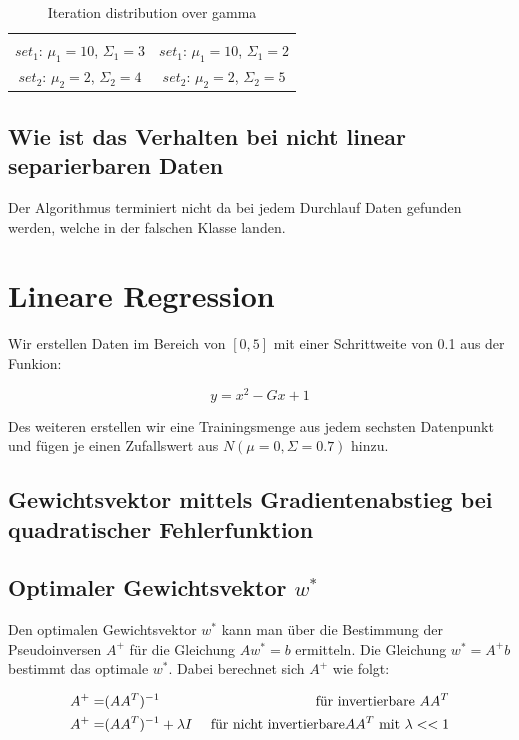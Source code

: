 \documentclass[]{report}
\begin{document}
\begin{table}[h]
\begin{tabular}{| c | c |}
 & \\
$set_1$: $\mu_1=10$, $\Sigma_1=3$ & $set_1$: $\mu_1=10$, $\Sigma_1=2$ \\
$set_2$: $\mu_2=2$, $\Sigma_2=4$ & $set_2$: $\mu_2=2$, $\Sigma_2=5$ \\
\hline
\end{tabular}
\caption{Iteration distribution over gamma}
\label{tab:DataSetsAndBounds}
\end{table}


\subsection{Wie ist das Verhalten bei nicht linear separierbaren Daten}

Der Algorithmus terminiert nicht da bei jedem Durchlauf Daten gefunden werden, welche in der falschen Klasse landen.

\section{Lineare Regression}

Wir erstellen Daten im Bereich von $[0,5]$ mit einer Schrittweite von 0.1 aus der Funkion:

\begin{equation}
y=x^2-Gx+1
\end{equation}

Des weiteren erstellen wir eine Trainingsmenge aus jedem sechsten Datenpunkt und f\"ugen je einen Zufallswert aus $N(\mu=0,\Sigma=0.7)$ hinzu.

\subsection{Gewichtsvektor mittels Gradientenabstieg bei quadratischer Fehlerfunktion}

\subsection{Optimaler Gewichtsvektor $w^*$}

Den optimalen Gewichtsvektor $w^*$ kann man \"uber die Bestimmung der Pseudoinversen $A^+$ f\"ur die Gleichung $Aw^*=b$ ermitteln.
Die Gleichung $w^*=A^+b$ bestimmt das optimale $w^*$. 
Dabei berechnet sich $A^+$ wie folgt:

\begin{eqnarray}
A^+ =& (AA^T)^{-1} &\textnormal{ f\"ur invertierbare } AA^T \\
A^+ =& (AA^T)^{-1} + \lambda I &\textnormal{ f\"ur nicht invertierbare} AA^T \textnormal{ mit } \lambda<<1
\end{eqnarray}
\end{document}

